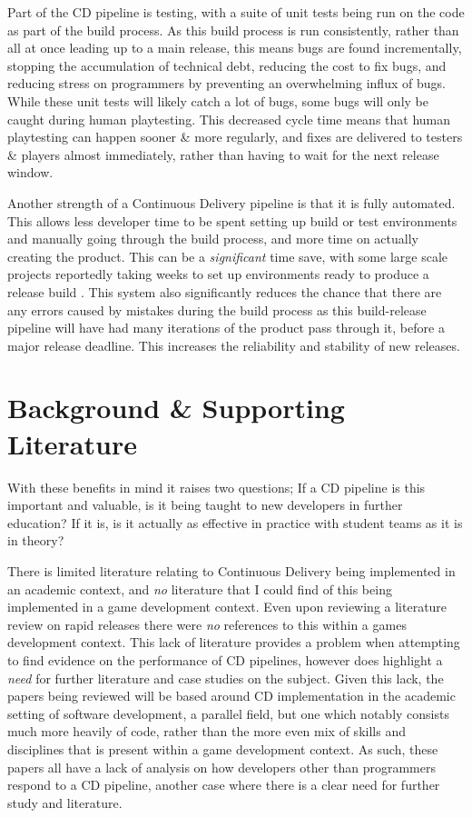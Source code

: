 \documentclass[lettersize,journal]{IEEEtran}
\begin{document}
        Part of the CD pipeline is testing, with a suite of unit tests being run on the code as part of the build process. As this build process is run consistently, rather than all at once leading up to a main release, this means bugs are found incrementally, stopping the accumulation of technical debt, reducing the cost to fix bugs, and reducing stress on programmers by preventing an overwhelming influx of bugs. While these unit tests will likely catch a lot of bugs, some bugs will only be caught during human playtesting. This decreased cycle time means that human playtesting can happen sooner \& more regularly, and fixes are delivered to testers \& players almost immediately, rather than having to wait for the next release window.
        
        Another strength of a Continuous Delivery pipeline is that it is fully automated. This allows less developer time to be spent setting up build or test environments and manually going through the build process, and more time on actually creating the product. This can be a \textit{significant} time save, with some large scale projects reportedly taking weeks to set up environments ready to produce a release build \cite{paddy, ContDelIntro}. This system also significantly reduces the chance that there are any errors caused by mistakes during the build process as this build-release pipeline will have had many iterations of the product pass through it, before a major release deadline. This increases the reliability and stability of new releases.
    
\section{Background \& Supporting Literature}
    With these benefits in mind it raises two questions; If a CD pipeline is this important and valuable, is it being taught to new developers in further education? If it is, is it actually as effective in practice with student teams as it is in theory?

    There is limited literature relating to Continuous Delivery being implemented in an academic context, and \textit{no} literature that I could find of this being implemented in a game development context. Even upon reviewing a literature review on rapid releases \cite{mantyla2015rapid} there were \textit{no} references to this within a games development context. This lack of literature provides a problem when attempting to find evidence on the performance of CD pipelines, however does highlight a \textit{need} for further literature and case studies on the subject. Given this lack, the papers being reviewed will be based around CD implementation in the academic setting of software development, a parallel field, but one which notably consists much more heavily of code, rather than the more even mix of skills and disciplines that is present within a game development context. As such, these papers all have a lack of analysis on how developers other than programmers respond to a CD pipeline, another case where there is a clear need for further study and literature.
\end{document}
